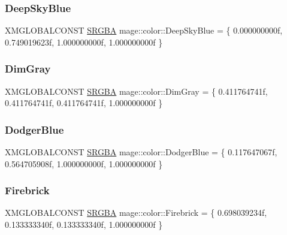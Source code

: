 \hypertarget{namespacemage_1_1color_a0f5aa2a109509a69b498e00328605c3f}{}\label{namespacemage_1_1color_a0f5aa2a109509a69b498e00328605c3f} 
\subsubsection{\texorpdfstring{Deep\+Sky\+Blue}{DeepSkyBlue}}
{\footnotesize\ttfamily X\+M\+G\+L\+O\+B\+A\+L\+C\+O\+N\+ST \hyperlink{structmage_1_1_s_r_g_b_a}{S\+R\+G\+BA} mage\+::color\+::\+Deep\+Sky\+Blue = \{ 0.\+000000000f, 0.\+749019623f, 1.\+000000000f, 1.\+000000000f \}}

\hypertarget{namespacemage_1_1color_ace5b9fdda0cd1693bee0e7c392c3f052}{}\label{namespacemage_1_1color_ace5b9fdda0cd1693bee0e7c392c3f052} 
\subsubsection{\texorpdfstring{Dim\+Gray}{DimGray}}
{\footnotesize\ttfamily X\+M\+G\+L\+O\+B\+A\+L\+C\+O\+N\+ST \hyperlink{structmage_1_1_s_r_g_b_a}{S\+R\+G\+BA} mage\+::color\+::\+Dim\+Gray = \{ 0.\+411764741f, 0.\+411764741f, 0.\+411764741f, 1.\+000000000f \}}

\hypertarget{namespacemage_1_1color_af164a12f2c4f24bfa492f5ad2acbcd27}{}\label{namespacemage_1_1color_af164a12f2c4f24bfa492f5ad2acbcd27} 
\subsubsection{\texorpdfstring{Dodger\+Blue}{DodgerBlue}}
{\footnotesize\ttfamily X\+M\+G\+L\+O\+B\+A\+L\+C\+O\+N\+ST \hyperlink{structmage_1_1_s_r_g_b_a}{S\+R\+G\+BA} mage\+::color\+::\+Dodger\+Blue = \{ 0.\+117647067f, 0.\+564705908f, 1.\+000000000f, 1.\+000000000f \}}

\hypertarget{namespacemage_1_1color_a0f29ed4ce29d47fe494ce2b623933d1f}{}\label{namespacemage_1_1color_a0f29ed4ce29d47fe494ce2b623933d1f} 
\subsubsection{\texorpdfstring{Firebrick}{Firebrick}}
{\footnotesize\ttfamily X\+M\+G\+L\+O\+B\+A\+L\+C\+O\+N\+ST \hyperlink{structmage_1_1_s_r_g_b_a}{S\+R\+G\+BA} mage\+::color\+::\+Firebrick = \{ 0.\+698039234f, 0.\+133333340f, 0.\+133333340f, 1.\+000000000f \}}

